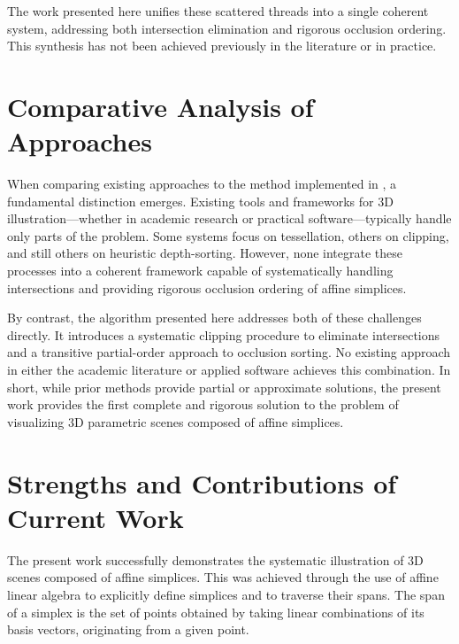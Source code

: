 The work presented here unifies these scattered threads into a 
single coherent system, addressing both intersection elimination 
and rigorous occlusion ordering. This synthesis has not been 
achieved previously in the literature or in practice.

\section{Comparative Analysis of Approaches}

When comparing existing approaches to the method implemented in 
\luatikztdtools{}, a fundamental distinction emerges. Existing 
tools and frameworks for \(3\)D illustration—whether in academic 
research or practical software—typically handle only parts of the 
problem. Some systems focus on tessellation, others on clipping, 
and still others on heuristic depth-sorting. However, none integrate 
these processes into a coherent framework capable of systematically 
handling intersections and providing rigorous occlusion ordering of 
affine simplices. 

By contrast, the algorithm presented here addresses both of these 
challenges directly. It introduces a systematic clipping procedure 
to eliminate intersections and a transitive partial-order approach 
to occlusion sorting. No existing approach in either the academic 
literature or applied software achieves this combination. In short, 
while prior methods provide partial or approximate solutions, the 
present work provides the first complete and rigorous solution to 
the problem of visualizing \(3\)D parametric scenes composed of 
affine simplices.

\section{Strengths and Contributions of Current Work}

The present work successfully demonstrates the systematic 
illustration of \(3\)D scenes composed of affine simplices. 
This was achieved through the use of affine linear algebra to 
explicitly define simplices and to traverse their spans. The span 
of a simplex is the set of points obtained by taking linear 
combinations of its basis vectors, originating from a given point. 

